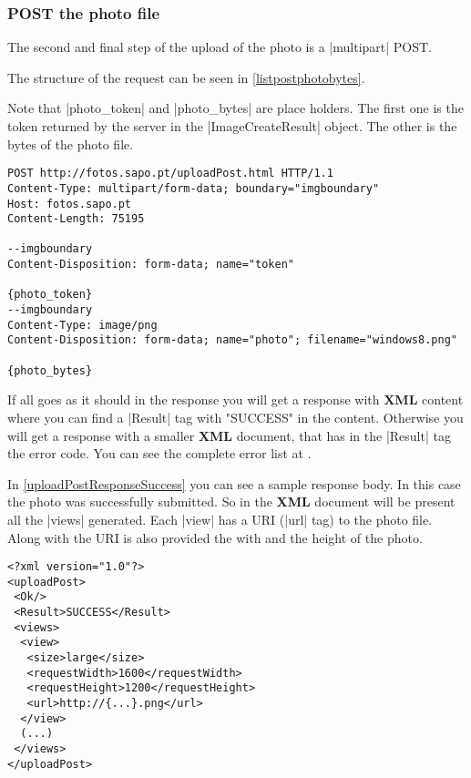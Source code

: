 \subsubsection{POST the photo file}
\label{sec:chapter4:photos:http:imagecreate:file}

The second and final step of the upload of the photo is a \icode|multipart| POST.

The structure of the request can be seen in \autoref{listpostphotobytes}.

Note that \icode|{photo_token}| and \icode|{photo_bytes}| are place holders. The first one is the token returned by the server in the \icode|ImageCreateResult| object. The other is the bytes of the photo file. 

\begin{lstlisting}[label=listpostphotobytes,caption=HTTP GET using \icode|ESBToken|]
POST http://fotos.sapo.pt/uploadPost.html HTTP/1.1
Content-Type: multipart/form-data; boundary="imgboundary"
Host: fotos.sapo.pt
Content-Length: 75195

--imgboundary
Content-Disposition: form-data; name="token"

{photo_token}
--imgboundary
Content-Type: image/png
Content-Disposition: form-data; name="photo"; filename="windows8.png"

{photo_bytes}
\end{lstlisting} 

If all goes as it should in the response you will get a response with \textbf{XML} content where you can find a \icode|Result| tag with "SUCCESS" in the content. Otherwise you will get a response with a smaller \textbf{XML} document, that has in the \icode|Result| tag the error code. You can see the complete error list at \cite{imagecreate}.

In \autoref{uploadPostResponseSuccess} you can see a sample response body. In this case the photo was successfully submitted. So in the \textbf{XML} document will be present all the \icode|views| generated. Each \icode|view| has a URI (\icode|url| tag) to the photo file. Along with the URI is also provided the with and the height of the photo.

\begin{lstlisting}[label=uploadPostResponseSuccess,caption=Photo file upload response body]
<?xml version="1.0"?>
<uploadPost>
 <Ok/>
 <Result>SUCCESS</Result>
 <views>
  <view>
   <size>large</size>
   <requestWidth>1600</requestWidth>
   <requestHeight>1200</requestHeight>
   <url>http://{...}.png</url>
  </view>
  (...)
 </views>
</uploadPost>
\end{lstlisting}

